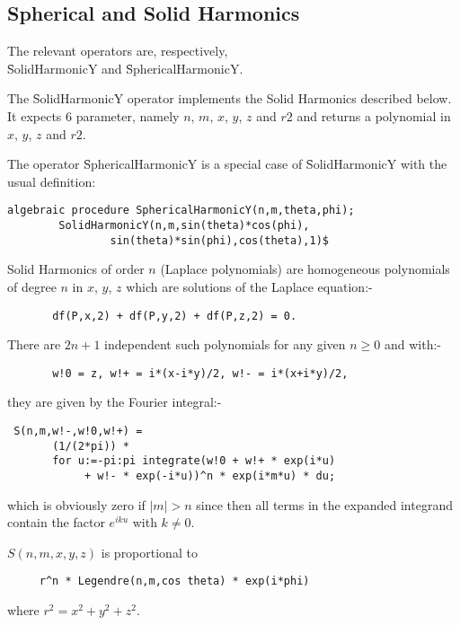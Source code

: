 \subsection{Spherical and Solid Harmonics}
\hypertarget{operator:SPHERICALHARMONICY}{}
\hypertarget{operator:SOLIDHARMONICY}{}
\hypertarget{SPHSOLH}{}
 

The relevant operators are, respectively,\\
\f{SolidHarmonicY} and \f{SphericalHarmonicY}.

The \f{SolidHarmonicY} operator implements the Solid Harmonics
described below. It expects 6 parameter, namely $n$, $m$, $x$, $y$, $z$ and $r2$
and returns a polynomial in $x$, $y$, $z$ and $r2$.

The operator
\f{SphericalHarmonicY} is a special case of \f{SolidHarmonicY}
with the usual definition:

\begin{verbatim}
algebraic procedure SphericalHarmonicY(n,m,theta,phi);
        SolidHarmonicY(n,m,sin(theta)*cos(phi),
                sin(theta)*sin(phi),cos(theta),1)$
\end{verbatim}


Solid Harmonics of order $n$ (Laplace polynomials)
are homogeneous polynomials of degree $n$ in $x$, $y$, $z$
which are solutions of the Laplace equation:-

\begin{verbatim}
       df(P,x,2) + df(P,y,2) + df(P,z,2) = 0.
\end{verbatim}

There are $2n+1$ independent such polynomials for any given $n \geq 0$
and with:-

\begin{verbatim}
       w!0 = z, w!+ = i*(x-i*y)/2, w!- = i*(x+i*y)/2,
\end{verbatim}

they are given by the Fourier integral:-

\begin{verbatim}
 S(n,m,w!-,w!0,w!+) =
       (1/(2*pi)) *
       for u:=-pi:pi integrate(w!0 + w!+ * exp(i*u)
            + w!- * exp(-i*u))^n * exp(i*m*u) * du;
\end{verbatim}

which is obviously zero if $|m| > n$ since then all terms in the
expanded integrand contain the factor $e^{iku}$ with $k \neq 0$.

$S(n,m,x,y,z)$ is proportional to
\begin{verbatim}
     r^n * Legendre(n,m,cos theta) * exp(i*phi)
\end{verbatim}
where $r^2 = x^2 + y^2 + z^2$.


